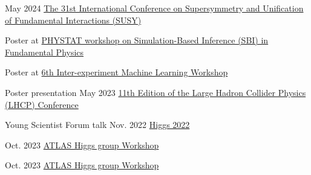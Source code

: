 
\begin{cventries}
    {}
    {May 2024}
    {\href{https://indico.cern.ch/event/1354279/contributions/5942297/}{The 31st International Conference on Supersymmetry and Unification of Fundamental Interactions (SUSY)}}
    {}\vspace*{2mm}

    {}
    {}
    {}
    {
        \begin{cvitems}
        \item Poster at \href{https://indico.cern.ch/event/1355601/contributions/5910202/}{PHYSTAT workshop on Simulation-Based Inference (SBI) in Fundamental Physics}
        \item Poster at \href{https://indico.cern.ch/event/1297159/contributions/5729232/}{6th Inter-experiment Machine Learning Workshop}
        \end{cvitems}
    }\vspace*{2mm}
    
    {Poster presentation}
    {May 2023}
    {\href{https://indico.cern.ch/event/1198609/contributions/5340462/}{11th Edition of the Large Hadron Collider Physics (LHCP) Conference}}
    {}\vspace*{2mm}
    
    {Young Scientist Forum talk}
    {Nov. 2022}
    {\href{https://indico.cern.ch/event/1086716/contributions/5049260/}{Higgs 2022}}
    {}\vspace*{2mm}


    {}
    {Oct. 2023}
    {\href{https://indico.cern.ch/event/1280531/contributions/5556190/}{ATLAS Higgs group Workshop}}{}\vspace*{2mm}

    {}
    {Oct. 2023}
    {\href{https://indico.cern.ch/event/1280531/contributions/5559532/}{ATLAS Higgs group Workshop}}{}\vspace*{2mm}


\end{cventries}
